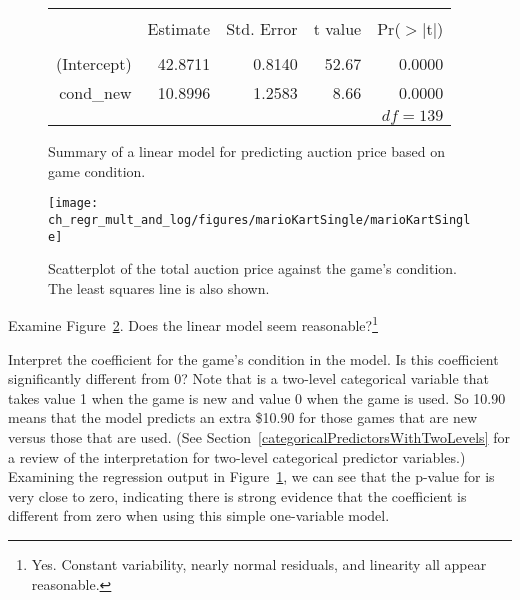 \begin{figure}[ht]
\centering
\begin{tabular}{rrrrr}
  \hline
  \vspace{-3.7mm} & & & & \\
 & Estimate & Std. Error & t value & Pr($>$$|$t$|$) \\ 
  \hline
  \vspace{-3.8mm} & & & & \\
(Intercept) & 42.8711 & 0.8140 & 52.67 & 0.0000 \\ 
  cond\_\hspace{0.3mm}new & 10.8996 & 1.2583 & 8.66 & 0.0000 \\ 
   \hline
   &&&\multicolumn{2}{r}{$df=139$}
\end{tabular}
\caption{Summary of a linear model for predicting auction price based on game condition.}
\label{singleVarModelsForPriceUsingCond}
\end{figure}

\begin{figure}
\centering
\texttt{[image: ch\_regr\_mult\_and\_log/figures/marioKartSingle/marioKartSingle]}
\caption{Scatterplot of the total auction price against the game's condition. The least squares line is also shown.}
\label{marioKartSingle}
\end{figure}

\begin{exercise}
Examine Figure~\ref{marioKartSingle}. Does the linear model seem reasonable?\footnote{Yes. Constant variability, nearly normal residuals, and linearity all appear reasonable.}
\end{exercise}

\begin{example}{Interpret the coefficient for the game's condition in the model. Is this coefficient significantly different from 0?}
Note that  is a two-level categorical variable that takes value 1 when the game is new and value 0 when the game is used. So 10.90 means that the model predicts an extra \$10.90 for those games that are new versus those that are used. (See Section~\ref{categoricalPredictorsWithTwoLevels} for a review of the interpretation for two-level categorical predictor variables.) Examining the regression output in Figure~\ref{singleVarModelsForPriceUsingCond}, we can see that the p-value for  is very close to zero, indicating there is strong evidence that the coefficient is different from zero when using this simple one-variable model.
\end{example}

